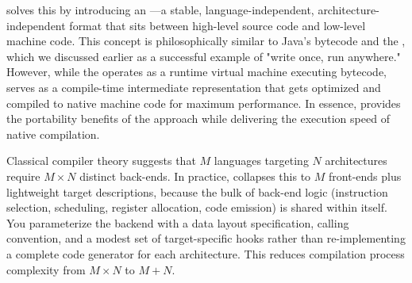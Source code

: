  solves this by introducing an \textbf{}—a stable, language-independent, architecture-independent format that sits between high-level source code and low-level machine code. This concept is philosophically similar to Java's bytecode and the , which we discussed earlier as a successful example of "write once, run anywhere." However, while the  operates as a runtime virtual machine executing bytecode,   serves as a compile-time intermediate representation that gets optimized and compiled to native machine code for maximum performance. In essence,  provides the portability benefits of the  approach while delivering the execution speed of native compilation.

Classical compiler theory suggests that \(M\) languages targeting \(N\) architectures require \(M \times N\) distinct back-ends. In practice,  collapses this to \(M\) front-ends plus lightweight target descriptions, because the bulk of back-end logic (instruction selection, scheduling, register allocation, code emission) is shared within  itself. You parameterize the backend with a data layout specification, calling convention, and a modest set of target-specific hooks rather than re-implementing a complete code generator for each architecture. This reduces compilation process complexity from \(M \times N\) to \(M + N\).
